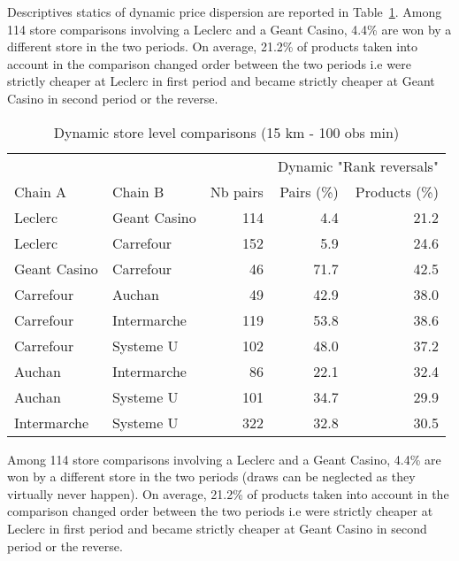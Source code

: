 \documentclass[english]{article}
\begin{document}
Descriptives statics of dynamic price dispersion are reported in Table~\ref{tab:dynamic_compa_15km}. Among 114 store comparisons involving a Leclerc and a Geant Casino, 4.4\% are won by a different store in the two periods. On average, 21.2\% of products taken into account in the comparison changed order between the two periods i.e were strictly cheaper at Leclerc in first period and became strictly cheaper at Geant Casino in second period or the reverse.

\begin{table}[H]
\begin{threeparttable}
\renewcommand{\arraystretch}{0.7}%
\caption{Dynamic store level comparisons (15 km - 100 obs min)
}\label{tab:dynamic_compa_15km}
\small
\begin{tabular}{llrrr}
\toprule
\toprule
    \textbf{} &       &       & \multicolumn{2}{c}{Dynamic "Rank reversals"} \\
    Chain A & Chain B & Nb pairs & Pairs (\%) & Products (\%) \\
\midrule
    Leclerc & Geant Casino & 114   & 4.4   & 21.2 \\
    Leclerc & Carrefour & 152   & 5.9   & 24.6 \\
    Geant Casino & Carrefour & 46    & 71.7  & 42.5 \\
    Carrefour & Auchan & 49    & 42.9  & 38.0 \\
    Carrefour & Intermarche & 119   & 53.8  & 38.6 \\
    Carrefour & Systeme U & 102   & 48.0  & 37.2 \\
    Auchan & Intermarche & 86    & 22.1  & 32.4 \\
    Auchan & Systeme U & 101   & 34.7  & 29.9 \\
    Intermarche & Systeme U & 322   & 32.8  & 30.5 \\
\bottomrule
\bottomrule
\end{tabular}
\begin{tablenotes}
      \small
      \item Among 114 store comparisons involving a Leclerc and a Geant Casino, 4.4\% are won by a different store in the two periods (draws can be neglected as they virtually never happen). On average, 21.2\% of products taken into account in the comparison changed order between the two periods i.e were strictly cheaper at Leclerc in first period and became strictly cheaper at Geant Casino in second period or the reverse.
\end{tablenotes}
\end{threeparttable}
\end{table}
\end{document}
